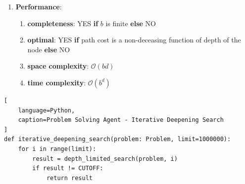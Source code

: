\begin{enumerate}[itemsep=0.2cm]
    \item \textbf{Performance}:
    \begin{enumerate}[itemsep=0.2cm]
        \item \textbf{completeness}: YES \textbf{if} $b$ is finite \textbf{else} NO
        \hfill \cite{ai/book/Artificial-Intelligence-A-Modern-Approach/Russell-Norvig}

        \item \textbf{optimal}: YES \textbf{if} path cost is a non-deceasing function of depth of the node \textbf{else} NO
        \hfill \cite{ai/book/Artificial-Intelligence-A-Modern-Approach/Russell-Norvig}
        
        \item \textbf{space complexity}: $\mathcal{O}(b d)$
        \hfill \cite{ai/book/Artificial-Intelligence-A-Modern-Approach/Russell-Norvig}

        \item \textbf{time complexity}: $\mathcal{O}(b^d)$
        \hfill \cite{ai/book/Artificial-Intelligence-A-Modern-Approach/Russell-Norvig}
    \end{enumerate}
\end{enumerate}

\vspace{0.5cm}

\begin{algorithm}[H]
    \caption{The iterative deepening search algorithm, which repeatedly applies depth-limited search with increasing limits. It terminates when a solution is found or if the depth-limited search returns failure, meaning that no solution exists. \cite{ai/book/Artificial-Intelligence-A-Modern-Approach/Russell-Norvig}}

\end{algorithm}


\begin{lstlisting}[
    language=Python,
    caption=Problem Solving Agent - Iterative Deepening Search 
]
def iterative_deepening_search(problem: Problem, limit=1000000):
    for i in range(limit):
        result = depth_limited_search(problem, i)
        if result != CUTOFF:
            return result
\end{lstlisting}






